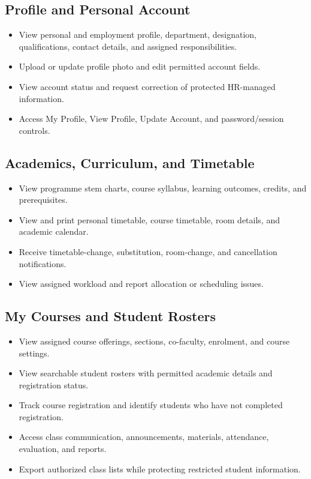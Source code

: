 \documentclass[10pt,a4paper]{article}
\begin{document}
\subsection{Profile and Personal Account}
\begin{itemize}
  \item View personal and employment profile, department, designation, qualifications,
        contact details, and assigned responsibilities.
  \item Upload or update profile photo and edit permitted account fields.
  \item View account status and request correction of protected HR-managed information.
  \item Access My Profile, View Profile, Update Account, and password/session controls.
\end{itemize}

\subsection{Academics, Curriculum, and Timetable}
\begin{itemize}
  \item View programme stem charts, course syllabus, learning outcomes, credits, and prerequisites.
  \item View and print personal timetable, course timetable, room details, and academic calendar.
  \item Receive timetable-change, substitution, room-change, and cancellation notifications.
  \item View assigned workload and report allocation or scheduling issues.
\end{itemize}

\subsection{My Courses and Student Rosters}
\begin{itemize}
  \item View assigned course offerings, sections, co-faculty, enrolment, and course settings.
  \item View searchable student rosters with permitted academic details and registration status.
  \item Track course registration and identify students who have not completed registration.
  \item Access class communication, announcements, materials, attendance, evaluation, and reports.
  \item Export authorized class lists while protecting restricted student information.
\end{itemize}
\end{document}
